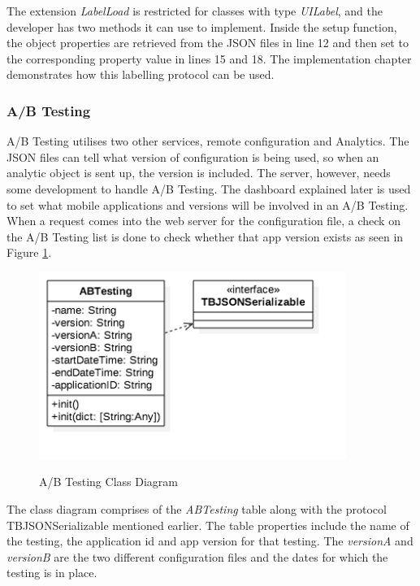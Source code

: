 The extension \textit{LabelLoad} is restricted for classes with type \textit{UILabel}, and the developer has two methods it can use to implement. Inside the setup function, the object properties are retrieved from the JSON files in line 12 and then set to the corresponding property value in lines 15 and 18. The implementation chapter demonstrates
 how this labelling protocol can be used.



\subsubsection{A/B Testing} \label{dev:sub_ab}

A/B Testing utilises two other services, remote configuration and Analytics. The JSON files can tell what version of configuration is being used, so when an analytic object is sent up, the version is included. The server, however, needs some development to handle A/B Testing. The dashboard explained later is used to set what mobile applications and versions will be involved in an A/B Testing. When a request comes into the web server for the configuration file, a check on the A/B Testing list is done to check whether that app version exists as seen in Figure \ref{fig:abtesting-cd}. 

\begin{figure}[!h]
    \caption{A/B Testing Class Diagram}
    \centering
    \includegraphics[width=100mm]{images/classdiagrams/ABTesting}
    \label{fig:abtesting-cd}
\end{figure}

The class diagram comprises of the \textit{ABTesting} table along with the protocol TBJSONSerializable mentioned earlier. The table properties include the name of the testing, the application id and app version for that testing. The \textit{versionA} and \textit{versionB} are the two different configuration files and the dates for which the testing is in place.

